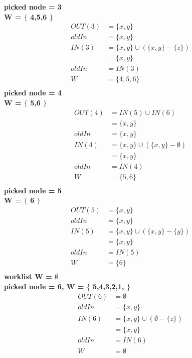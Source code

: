 \documentclass[a4paper, 12pt]{article}
\begin{document}
\textbf{picked node = 3} \\
\textbf{W = $\lbrace$ 4,5,6 $\rbrace$} \\
\begin{align*}
	OUT(3) &= \lbrace x,y \rbrace \\
	oldIn &= \lbrace x,y \rbrace \\
	IN(3) &= \lbrace x,y \rbrace \cup (\lbrace x,y \rbrace - \lbrace z \rbrace) \\
	&= \lbrace x,y \rbrace \\
	oldIn &= IN(3) \\
	W &= \lbrace 4,5,6 \rbrace \\
\end{align*}
\textbf{picked node = 4} \\
\textbf{W = $\lbrace$ 5,6 $\rbrace$} \\
\begin{align*}
	OUT(4) &= IN(5) \cup IN(6) \\
	&= \lbrace x,y \rbrace \\
	oldIn &= \lbrace x,y \rbrace \\
	IN(4) &= \lbrace x,y \rbrace \cup (\lbrace x,y \rbrace - \emptyset) \\
	&= \lbrace x,y \rbrace \\
	oldIn &= IN(4) \\
	W &= \lbrace 5,6 \rbrace \\
\end{align*}
\textbf{picked node = 5} \\
\textbf{W = $\lbrace$ 6 $\rbrace$} \\
\begin{align*}
	OUT(5) &= \lbrace x,y \rbrace \\
	oldIn &= \lbrace x,y \rbrace \\
	IN(5) &= \lbrace x,y \rbrace \cup (\lbrace x,y \rbrace - \lbrace y \rbrace) \\
	&= \lbrace x,y \rbrace \\
	oldIn &= IN(5) \\
	W &= \lbrace 6 \rbrace \\
\end{align*}
\textbf{worklist W = $\emptyset$} \\
\textbf{picked node = 6, W = $\lbrace$ 5,4,3,2,1, $\rbrace$}
\begin{align*}
	OUT(6) &= \emptyset \\
	oldIn &= \lbrace x,y \rbrace \\
	IN(6) &= \lbrace x,y \rbrace \cup (\emptyset - \lbrace z \rbrace) \\
	&= \lbrace x,y \rbrace \\
	oldIn &= IN(6) \\
	W &= \emptyset \\
\end{align*} 
\end{document}
